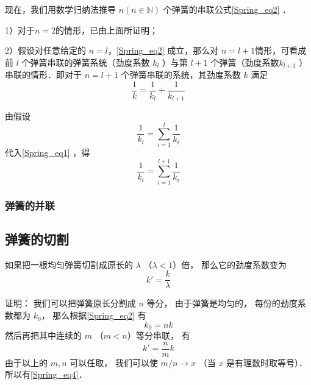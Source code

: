 现在，我们用数学归纳法推导 $n(n\in \mathbb N)$ 个弹簧的串联公式\autoref{Spring_eq2} ．

1）对于$n=2$的情形，已由上面所证明；

2）假设对任意给定的 $n=l$，\autoref{Spring_eq2} 成立，那么对 $n=l+1$情形，可看成前 $l$ 个弹簧串联的弹簧系统（劲度系数 $k_l$ ）与第 $l+1$ 个弹簧（劲度系数$ k_{l+1}$ ）串联的情形．即对于 $n=l+1$ 个弹簧串联的系统，其劲度系数 $k$ 满足
\begin{equation}\label{Spring_eq1}
\frac{1}{k}=\frac{1}{k_l}+\frac{1}{k_{l+1}}
\end{equation}

由假设
\begin{equation}
\frac{1}{k_l}=\sum\limits_{i=1}^{l}\frac{1}{k_i}
\end{equation}
代入\autoref{Spring_eq1} ，得
\begin{equation}
\frac{1}{k_l}=\sum\limits_{i=1}^{l+1}\frac{1}{k_i}
\end{equation}

\subsubsection{弹簧的并联}
\subsection{弹簧的切割}
如果把一根均匀弹簧切割成原长的 $\lambda$ （$\lambda < 1$）倍， 那么它的劲度系数变为
\begin{equation}\label{Spring_eq4}
k' = \frac{k}{\lambda}
\end{equation}

证明： 我们可以把弹簧原长分割成 $n$ 等分， 由于弹簧是均匀的， 每份的劲度系数都为 $k_0$， 那么根据\autoref{Spring_eq2} 有
\begin{equation}
k_0 = nk
\end{equation}
然后再把其中连续的 $m$ （$m < n$）等分串联， 有
\begin{equation}
k' = \frac{n}{m}k
\end{equation}
由于以上的 $m, n$ 可以任取， 我们可以使 $m/n \to x$ （当 $x$ 是有理数时取等号）．所以有\autoref{Spring_eq4}．

